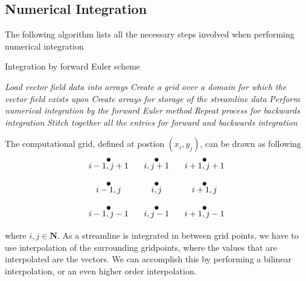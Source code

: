 \documentclass[main.tex]{subfiles}
\begin{document}
\subsection{Numerical Integration}
The following algorithm lists all the necessary steps involved when performing numerical
integration
\begin{algorithm}[H]
\caption{Integration by forward Euler scheme} \label{alg:FE_Integration}
\begin{algorithmic}[1]
\State \textit{Load vector field data into arrays}
\State \textit{Create a grid over a domain for which the vector field exists upon}
\State \textit{Create arrays for storage of the streamline data}
\State \textit{Perform numerical integration by the forward Euler method}
\State \textit{Repeat process for backwards integration}
\State \textit{Stitch together all the entries for forward and backwards integration}
\end{algorithmic}
\end{algorithm}

The computational grid, defined at postion $(x_i,y_j)$, can be drawn as following
\begin{align*}
\begin{tikzpicture}
	\draw [fill] (-2,2) circle [radius=2pt] node[below]{$i-1,j+1$};
	\draw [fill] (0,2) circle [radius=2pt] node[below]{$i,j+1$};
	\draw [fill] (2,2) circle [radius=2pt] node[below]{$i+1,j+1$};
	\draw [fill] (-2,1) circle [radius=2pt] node[below]{$i-1,j$};
	\draw [fill] (0,1) circle [radius=2pt] node[below]{$i,j$};
	\draw [fill] (2,1) circle [radius=2pt] node[below]{$i+1,j$};
	\draw [fill] (-2,0) circle [radius=2pt] node[below]{$i-1,j-1$};
	\draw [fill] (0,0) circle [radius=2pt] node[below]{$i,j-1$};
	\draw [fill] (2,0) circle [radius=2pt] node[below]{$i+1,j-1$};
\end{tikzpicture}
\end{align*}
where $i,j \in \mathbf{N}$. As a streamline is integrated in between grid points, 
we have to use interpolation of the surrounding gridpoints, where
the values that are interpolated are the vectors. We can accomplish this by 
performing a bilinear interpolation, or an even higher order interpolation.


\end{document}
